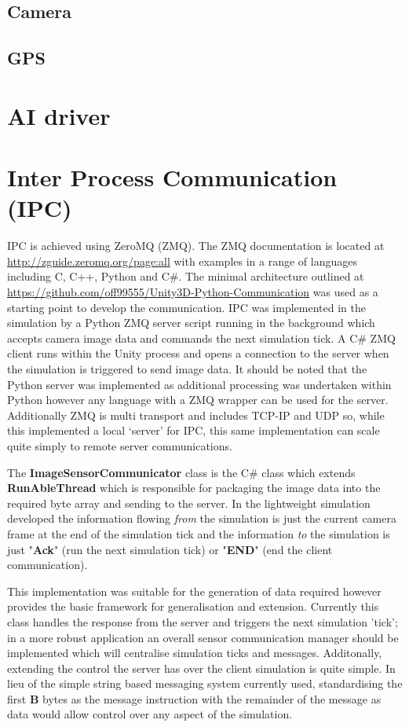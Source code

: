 \documentclass{article}
\begin{document}
\subsection{Camera}

\subsection{GPS}

\section{AI driver}


\section{Inter Process Communication (IPC)}

IPC is achieved using ZeroMQ (ZMQ). The ZMQ documentation is located at \url{http://zguide.zeromq.org/page:all} with examples in a range of languages including C, C++, Python and C\#. The minimal architecture outlined at \url{https://github.com/off99555/Unity3D-Python-Communication} was used as a starting point to develop the communication. IPC was implemented in the simulation by a Python ZMQ server script running in the background which accepts camera image data and commands the next simulation tick. A C\# ZMQ client runs within the Unity process and opens a connection to the server when the simulation is triggered to send image data. It should be noted that the Python server was implemented as additional processing was undertaken within Python however any language with a ZMQ wrapper can be used for the server. Additionally ZMQ is multi transport and includes TCP-IP and UDP so, while this implemented a local `server' for IPC, this same implementation can scale quite simply to remote server communications. 

The \textbf{ImageSensorCommunicator} class is the C\# class which extends \textbf{RunAbleThread} which is responsible for packaging the image data into the required byte array and sending to the server. In the lightweight simulation developed the information flowing \textit{from} the simulation is just the current camera frame at the end of the simulation tick and the information \textit{to} the simulation is just "\textbf{Ack}" (run the next simulation tick) or "\textbf{END}" (end the client communication).

This implementation was suitable for the generation of data required however provides the basic framework for generalisation and extension. Currently this class handles the response from the server and triggers the next simulation 'tick'; in a more robust application an overall sensor communication manager should be implemented which will centralise simulation ticks and messages. Additonally, extending the control the server has over the client simulation is quite simple. In lieu of the simple string based messaging system currently used, standardising the first \textbf{B} bytes as the message instruction with the remainder of the message as data would allow control over any aspect of the simulation. 
\end{document}
